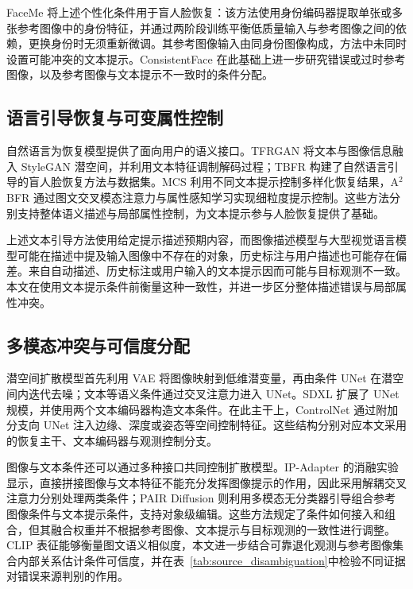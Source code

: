 \documentclass[journal]{IEEEtran}
\begin{document}
FaceMe 将上述个性化条件用于盲人脸恢复：该方法使用身份编码器提取单张或多张参考图像中的身份特征，并通过两阶段训练平衡低质量输入与参考图像之间的依赖，更换身份时无须重新微调\cite{liu2025faceme}。其参考图像输入由同身份图像构成，方法中未同时设置可能冲突的文本提示。ConsistentFace 在此基础上进一步研究错误或过时参考图像，以及参考图像与文本提示不一致时的条件分配。

\subsection{语言引导恢复与可变属性控制}
自然语言为恢复模型提供了面向用户的语义接口\cite{conde2024instructir,qi2024spire}。TFRGAN 将文本与图像信息融入 StyleGAN 潜空间，并利用文本特征调制解码过程\cite{xie2023tfrgan}；TBFR 构建了自然语言引导的盲人脸恢复方法与数据集\cite{an2026tbfr}。MCS 利用不同文本提示控制多样化恢复结果\cite{li2025mcs}，A$^2$BFR 通过图文交叉模态注意力与属性感知学习实现细粒度提示控制\cite{zhu2026a2bfr}。这些方法分别支持整体语义描述与局部属性控制，为文本提示参与人脸恢复提供了基础。

上述文本引导方法使用给定提示描述预期内容，而图像描述模型与大型视觉语言模型可能在描述中提及输入图像中不存在的对象\cite{rohrbach2018object,li2023pope}，历史标注与用户描述也可能存在偏差。来自自动描述、历史标注或用户输入的文本提示因而可能与目标观测不一致。本文在使用文本提示条件前衡量这种一致性，并进一步区分整体描述错误与局部属性冲突。

\subsection{多模态冲突与可信度分配}
潜空间扩散模型首先利用 VAE 将图像映射到低维潜变量，再由条件 UNet 在潜空间内迭代去噪；文本等语义条件通过交叉注意力进入 UNet\cite{rombach2022ldm}。SDXL 扩展了 UNet 规模，并使用两个文本编码器构造文本条件\cite{podell2023sdxl}。在此主干上，ControlNet 通过附加分支向 UNet 注入边缘、深度或姿态等空间控制特征\cite{zhang2023controlnet}。这些结构分别对应本文采用的恢复主干、文本编码器与观测控制分支。

图像与文本条件还可以通过多种接口共同控制扩散模型。IP-Adapter 的消融实验显示，直接拼接图像与文本特征不能充分发挥图像提示的作用，因此采用解耦交叉注意力分别处理两类条件\cite{ye2023ipadapter}；PAIR Diffusion 则利用多模态无分类器引导组合参考图像条件与文本提示条件，支持对象级编辑\cite{goel2024pairdiffusion}。这些方法规定了条件如何接入和组合，但其融合权重并不根据参考图像、文本提示与目标观测的一致性进行调整。CLIP 表征能够衡量图文语义相似度\cite{radford2021clip}，本文进一步结合可靠退化观测与参考图像集合内部关系估计条件可信度，并在表~\ref{tab:source_disambiguation}中检验不同证据对错误来源判别的作用。
\end{document}
